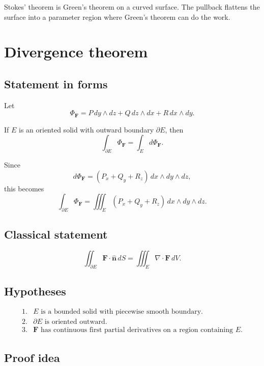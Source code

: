 Stokes' theorem is Green's theorem on a curved surface.  The pullback flattens the
surface into a parameter region where Green's theorem can do the work.

\section{Divergence theorem}
\label{app:F.6}

\subsection*{Statement in forms}

Let
\[
    \Phi_{\mathbf F}
    =
    P\,dy\wedge dz
    +
    Q\,dz\wedge dx
    +
    R\,dx\wedge dy.
\]

If \(E\) is an oriented solid with outward boundary \(\partial E\), then
\[
\boxed{
    \int_{\partial E}\Phi_{\mathbf F}
    =
    \int_E d\Phi_{\mathbf F}.
}
\]

Since
\[
    d\Phi_{\mathbf F}
    =
    (P_x+Q_y+R_z)\,dx\wedge dy\wedge dz,
\]
this becomes
\[
\boxed{
    \int_{\partial E}\Phi_{\mathbf F}
    =
    \iiint_E
    (P_x+Q_y+R_z)\,dx\wedge dy\wedge dz.
}
\]

\subsection*{Classical statement}

\[
\boxed{
    \iint_{\partial E}
    \mathbf F\cdot\widehat{\mathbf n}\,dS
    =
    \iiint_E
    \nabla\cdot\mathbf F\,dV.
}
\]

\subsection*{Hypotheses}

\[
\begin{array}{ll}
1. & E\text{ is a bounded solid with piecewise smooth boundary.}\\[1mm]
2. & \partial E\text{ is oriented outward.}\\[1mm]
3. & \mathbf F\text{ has continuous first partial derivatives on a region containing }E.
\end{array}
\]

\subsection*{Proof idea}

